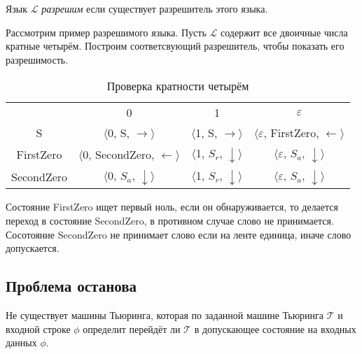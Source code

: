 \documentclass{article}
\begin{document}
\begin{definition} Язык $\mathcal{L}$ \textit{разрешим} если существует разрешитель этого языка.
\end{definition} 

Рассмотрим пример разрешимого языка. Пусть $\mathcal{L}$ содержит все двоичные числа кратные четырём. Построим соответсвующий разрешитель, чтобы показать его разрешимость.

\begin{table}[h]
    \centering
    \begin{tabular}{c c c c}
        & 0 & 1 & $\varepsilon$ \\
        
        S &
        $\langle$0, S, $\rightarrow\rangle$ & 
        $\langle$1, S, $\rightarrow\rangle$ & 
        $\langle\varepsilon$, FirstZero, $\leftarrow\rangle$ \\
        
        FirstZero &
        $\langle$0, SecondZero, $\leftarrow\rangle$ &
        $\langle$1, $S_r$, $\downarrow\rangle$ &
        $\langle\varepsilon$, $S_a$, $\downarrow\rangle$ \\
        
        SecondZero &
        $\langle$0, $S_a$, $\downarrow\rangle$ &
        $\langle$1, $S_r$, $\downarrow\rangle$ &
        $\langle\varepsilon$, $S_a$, $\downarrow\rangle$ \\
    \end{tabular}
    \caption{Проверка кратности четырём}
    \label{tab:my_label}
\end{table}

Состояние FirstZero ищет первый ноль, если он обнаруживается, то делается переход в состояние SecondZero, в противном случае слово не принимается. Сосотояние SecondZero не принимает слово если на ленте единица, иначе слово допускается. 

\subsection{Проблема останова}

\begin{theorem} Не существует машины Тьюринга, которая по заданной машине Тьюринга $\mathcal{T}$ и входной строке $\phi$ определит перейдёт ли $\mathcal{T}$ в допускающее состояние на входных данных $\phi$.
\end{theorem}
\end{document}
